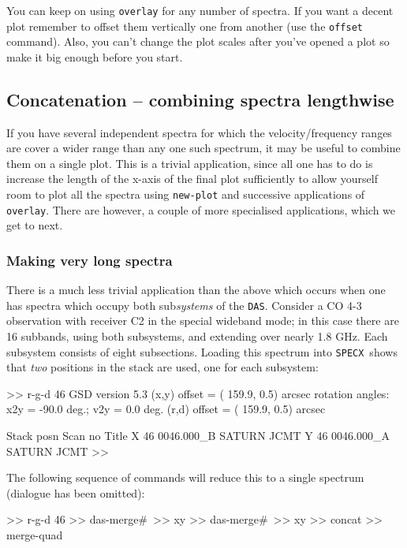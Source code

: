 \documentclass[11pt,twoside]{starlink}
\providecommand{\SPECX}{\texttt{SPECX}}
\providecommand{\das}{\texttt{DAS}}
\begin{document}
You can keep on using \texttt{overlay} for any number of spectra. If you
want a decent plot remember to offset them vertically one from another
(use the \texttt{offset} command). Also, you can't change the plot scales
after you've opened a plot so make it big enough before you start.

\subsection{Concatenation -- combining spectra lengthwise}
If you have several independent spectra for which the
velocity/frequency ranges are cover a wider range than any one such
spectrum, it may be useful to combine them on a single plot. This is a
trivial application, since all one has to do is increase the length of
the x-axis of the final plot sufficiently to allow yourself room to
plot all the spectra using \texttt{new-plot} and successive applications
of \texttt{overlay}. There are however, a couple of more specialised
applications, which we get to next.

\subsubsection{Making very long spectra}
\label{sec:long-spectra}
There is a much less trivial application than the above which occurs
when one has spectra which occupy both sub\textit{systems} of the \das .
Consider a CO 4-3 observation with receiver C2 in the
special wideband mode; in this case there are 16 subbands, using both
subsystems, and extending over nearly 1.8 GHz. Each subsystem consists
of eight subsections.  Loading this spectrum into \SPECX\ shows that
\textit{two} positions in the stack are used, one for each subsystem:

\begin{terminalv}
 >> r-g-d 46
 GSD version  5.3
          (x,y) offset = ( 159.9,   0.5) arcsec
          rotation angles: x2y =  -90.0 deg.; v2y =    0.0 deg.
          (r,d) offset = ( 159.9,   0.5) arcsec


 Stack posn    Scan no    Title
     X           46      0046.000_B  SATURN   JCMT
     Y           46      0046.000_A  SATURN   JCMT
 >>
\end{terminalv}

The following sequence of commands will reduce this to a single
spectrum (dialogue has been omitted):

\begin{terminalv}
>> r-g-d 46
>> das-merge\#\n\
>> xy
>> das-merge\#\n\
>> xy
>> concat
>> merge-quad\n\
\end{terminalv}
\end{document}
